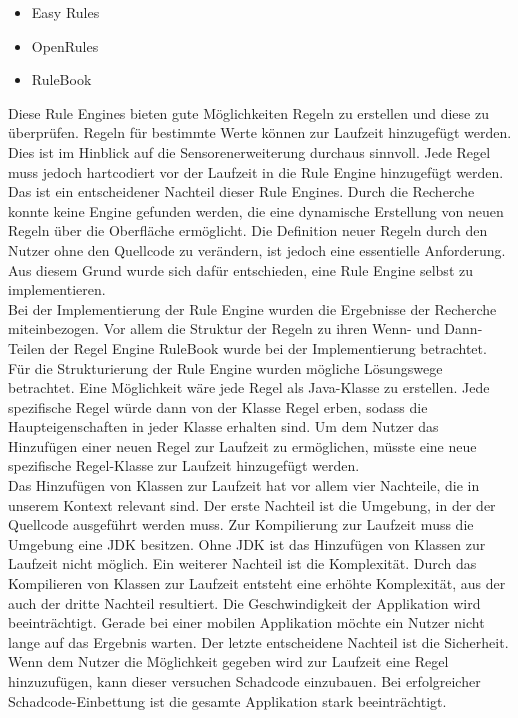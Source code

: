 \begin{itemize}                                                                                                               
	\item Easy Rules \cite{github:easyrules}
	\item OpenRules \cite{openrules}
	\item RuleBook \cite{github:rulebook}
\end{itemize}
Diese Rule Engines bieten gute Möglichkeiten Regeln zu erstellen und diese zu überprüfen. Regeln für bestimmte Werte können zur Laufzeit hinzugefügt werden. Dies ist im Hinblick auf die Sensorenerweiterung durchaus sinnvoll. Jede Regel muss jedoch hartcodiert vor der Laufzeit in die Rule Engine hinzugefügt werden. Das ist ein entscheidener Nachteil dieser Rule Engines. Durch die Recherche konnte keine Engine gefunden werden, die eine dynamische Erstellung von neuen Regeln über die Oberfläche ermöglicht. Die Definition neuer Regeln durch den Nutzer ohne den Quellcode zu verändern, ist jedoch eine essentielle Anforderung. Aus diesem Grund wurde sich dafür entschieden, eine Rule Engine selbst zu implementieren.\\
Bei der Implementierung der Rule Engine wurden die Ergebnisse der Recherche miteinbezogen. Vor allem die Struktur der Regeln zu ihren Wenn- und Dann-Teilen der Regel Engine RuleBook wurde bei der Implementierung betrachtet.\\
Für die Strukturierung der Rule Engine wurden mögliche Lösungswege betrachtet. Eine Möglichkeit wäre jede Regel als Java-Klasse zu erstellen. Jede spezifische Regel würde dann von der Klasse Regel erben, sodass die Haupteigenschaften in jeder Klasse erhalten sind. Um dem Nutzer das Hinzufügen einer neuen Regel zur Laufzeit zu ermöglichen, müsste
eine neue spezifische Regel-Klasse zur Laufzeit hinzugefügt werden.\\
Das Hinzufügen von Klassen zur Laufzeit hat vor allem vier Nachteile, die in unserem Kontext relevant sind. Der erste Nachteil ist die Umgebung, in der der Quellcode ausgeführt werden muss. Zur Kompilierung zur Laufzeit muss die Umgebung eine JDK besitzen. Ohne JDK ist das Hinzufügen von Klassen zur Laufzeit nicht möglich. Ein weiterer Nachteil ist die Komplexität. Durch das Kompilieren von Klassen zur Laufzeit entsteht eine erhöhte Komplexität, aus der auch der dritte Nachteil resultiert. Die Geschwindigkeit der Applikation wird beeinträchtigt. Gerade bei einer mobilen Applikation möchte ein Nutzer nicht lange auf das Ergebnis warten. Der letzte entscheidene Nachteil ist die Sicherheit. Wenn dem Nutzer die Möglichkeit gegeben wird zur Laufzeit eine Regel hinzuzufügen, kann dieser versuchen Schadcode einzubauen. Bei erfolgreicher Schadcode-Einbettung ist die gesamte Applikation stark beeinträchtigt.\\
